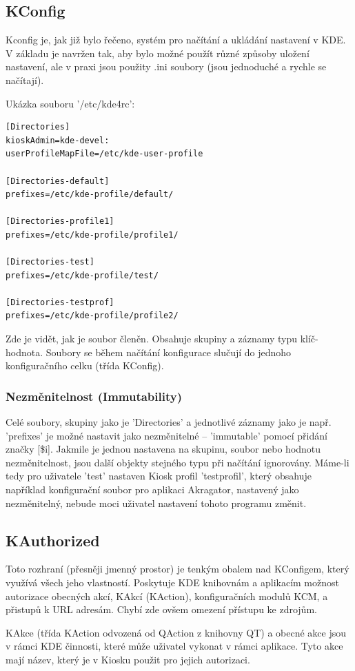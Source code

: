 \subsection{KConfig}
Kconfig je, jak již bylo řečeno, systém pro načítání a ukládání nastavení v KDE.
V základu je navržen tak, aby bylo možné použít různé způsoby uložení nastavení,
ale v praxi jsou použity .ini soubory (jsou jednoduché a rychle se načítají).

Ukázka souboru '/etc/kde4rc':
\begin{verbatim}
[Directories]
kioskAdmin=kde-devel:
userProfileMapFile=/etc/kde-user-profile

[Directories-default]
prefixes=/etc/kde-profile/default/

[Directories-profile1]
prefixes=/etc/kde-profile/profile1/

[Directories-test]
prefixes=/etc/kde-profile/test/

[Directories-testprof]
prefixes=/etc/kde-profile/profile2/
\end{verbatim}
Zde je vidět, jak je soubor členěn. Obsahuje skupiny a záznamy typu
klíč-hodnota. Soubory se během načítání konfigurace slučují do jednoho
konfiguračního celku
(třída KConfig).

\subsubsection{Nezměnitelnost (Immutability)}
Celé soubory, skupiny jako je 'Directories' a jednotlivé záznamy jako je např.
'prefixes' je možné nastavit jako nezměnitelné -- 'immutable' pomocí přidání
značky [\$i].
Jakmile je jednou nastavena na skupinu, soubor nebo hodnotu nezměnitelnost, jsou
další objekty stejného typu při načítání ignorovány. Máme-li tedy pro uživatele
'test' nastaven Kiosk profil 'testprofil', který obsahuje například konfigurační
soubor pro aplikaci Akragator, nastavený jako nezměnitelný, nebude moci uživatel
nastavení tohoto programu změnit.

\subsection{KAuthorized}
Toto rozhraní (přesněji jmenný prostor) je tenkým obalem nad KConfigem, který
využívá všech jeho vlastností. Poskytuje KDE knihovnám a aplikacím možnost
autorizace obecných akcí, KAkcí (KAction), konfiguračních modulů KCM, a přistupů
k URL adresám.
Chybí zde ovšem omezení přístupu ke zdrojům.

KAkce (třída KAction odvozená od QAction z knihovny QT) a obecné akce jsou
v rámci KDE  činnosti, které může uživatel vykonat v rámci aplikace. Tyto akce
mají název, který je v Kiosku použit pro jejich autorizaci.

